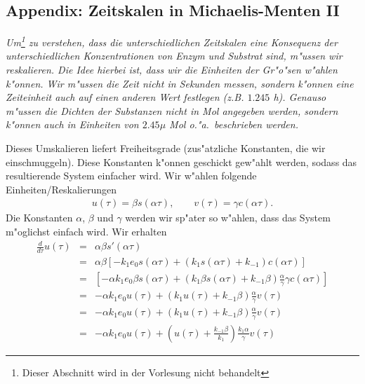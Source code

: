 \begin{auf}\che\label{block7A2}

\end{auf}






\subsection{Appendix: Zeitskalen in Michaelis-Menten II} 
\label{mmRescal}
{\it Um\footnote{Dieser Abschnitt wird in der Vorlesung nicht behandelt} zu verstehen, dass die unterschiedlichen Zeitskalen eine Konsequenz der unterschiedlichen 
Konzentrationen von Enzym und Substrat sind, m"ussen wir reskalieren. Die Idee hierbei ist,
dass wir die Einheiten der Gr"o"sen w"ahlen k"onnen. Wir m"ussen die Zeit nicht
in Sekunden messen, sondern k"onnen eine Zeiteinheit auch auf einen anderen Wert festlegen
(z.B. $1.245 $ h). Genauso m"ussen die Dichten der Substanzen nicht in Mol angegeben werden,
 sondern k"onnen auch in Einheiten von $2.45 \mu$ Mol o."a.\ beschrieben werden.\par
 Dieses Umskalieren liefert Freiheitsgrade (zus"atzliche Konstanten, die wir einschmuggeln).
 Diese Konstanten k"onnen geschickt gew"ahlt werden, sodass das resultierende System 
 einfacher wird. Wir w"ahlen folgende Einheiten/Reskalierungen
\begin{eqnarray*}
u(\tau) = \beta s(\alpha\tau),\qquad 
v(\tau) = \gamma c(\alpha \tau).
\end{eqnarray*}
Die Konstanten $\alpha$, $\beta$ und $\gamma$ werden wir sp"ater so w"ahlen, dass das System m"oglichst einfach wird.
Wir erhalten
\begin{eqnarray*}
\frac d {d\tau}u(\tau) & = & \alpha \beta s'(\alpha\tau)\\
& = & \alpha\beta [ -k_1 e_0 s(\alpha\tau) + (k_1 s(\alpha\tau)+k_{-1}) c(\alpha\tau) ]\\
& = & [ -\alpha k_1 e_0 \beta s(\alpha\tau) + (k_1 \beta s(\alpha\tau)+k_{-1}\beta ) \frac{\alpha}{\gamma} \gamma c(\alpha\tau) ]\\
& = & -\alpha k_1 e_0 u(\tau) + (k_1 u(\tau)+k_{-1}\beta ) \frac{\alpha}{\gamma} v(\tau) \\
& = &  -\alpha k_1 e_0 u(\tau) + (k_1 u(\tau)+k_{-1}\beta ) \frac{\alpha}{\gamma} v(\tau) \\
& = &  -\alpha k_1 e_0 u(\tau) + (u(\tau)+\frac{k_{-1}\beta}{k_1} ) \frac{k_1 \alpha}{\gamma} v(\tau) 

\end{eqnarray*}}
